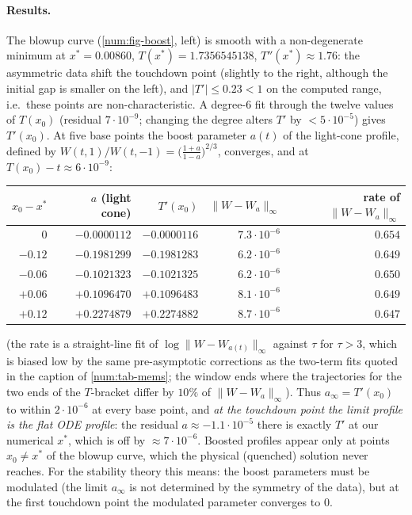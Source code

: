 \paragraph{Results.} The blowup curve (\cref{num:fig-boost}, left) is smooth
with a non-degenerate minimum at $x^*=0.00860$, $T(x^*)=1.7356545138$,
$T''(x^*)\approx1.76$: the asymmetric data shift the touchdown point (slightly
to the right, although the initial gap is smaller on the left), and
$|T'|\le0.23<1$ on the computed range, i.e.\ these points are non-characteristic. A degree-6 fit
through the twelve values of $T(x_0)$ (residual $7\cdot10^{-9}$; changing the
degree alters $T'$ by $<5\cdot10^{-5}$) gives $T'(x_0)$. At five base points the
boost parameter $a(t)$ of the light-cone profile, defined by
$W(t,1)/W(t,-1)=\big(\frac{1+a}{1-a}\big)^{2/3}$, converges, and at
$T(x_0)-t\approx6\cdot10^{-9}$:
\begin{center}\small
\begin{tabular}{@{}rrrrr@{}}
\toprule
$x_0-x^*$ & $a$ (light cone) & $T'(x_0)$ & $\|W-W_a\|_\infty$ & rate of $\|W-W_a\|_\infty$\\
\midrule
$0$ & $-0.0000112$ & $-0.0000116$ & $7.3\cdot10^{-6}$ & $0.654$\\
$-0.12$ & $-0.1981299$ & $-0.1981283$ & $6.2\cdot10^{-6}$ & $0.649$\\
$-0.06$ & $-0.1021323$ & $-0.1021325$ & $6.2\cdot10^{-6}$ & $0.650$\\
$+0.06$ & $+0.1096470$ & $+0.1096483$ & $8.1\cdot10^{-6}$ & $0.649$\\
$+0.12$ & $+0.2274879$ & $+0.2274882$ & $8.7\cdot10^{-6}$ & $0.647$\\
\bottomrule
\end{tabular}
\end{center}
(the rate is a straight-line fit of $\log\|W-W_{a(t)}\|_\infty$ against $\tau$ for $\tau>3$, which
is biased low by the same pre-asymptotic corrections as the two-term fits
quoted in the caption of \cref{num:tab-mems}; the window ends where the
trajectories for the two ends of the $T$-bracket differ by $10\%$ of
$\|W-W_a\|_\infty$). Thus $a_\infty=T'(x_0)$ to within $2\cdot10^{-6}$ at every
base point, and \emph{at the touchdown point the limit profile is the flat ODE
profile}: the residual $a\approx-1.1\cdot10^{-5}$ there is exactly $T'$ at
our numerical $x^*$, which is off by $\approx7\cdot10^{-6}$. Boosted
profiles appear only at points $x_0\neq x^*$ of the blowup curve, which the
physical (quenched) solution never reaches. For the stability theory this
means: the boost parameters must be modulated (the limit $a_\infty$ is not
determined by the symmetry of the data), but at the first touchdown point the
modulated parameter converges to $0$.

